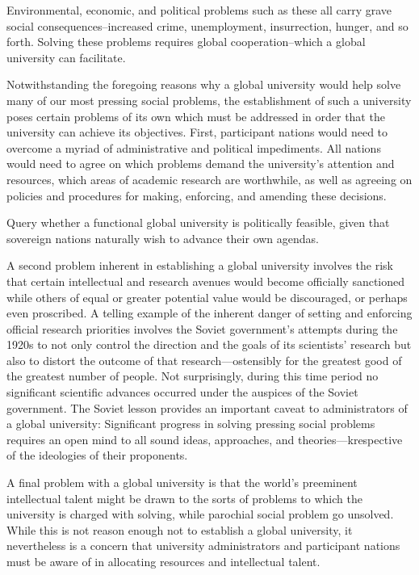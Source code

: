 Environmental, economic, and political problems such as these all carry grave social consequences--increased crime, unemployment, insurrection, hunger, and so forth.
Solving these problems requires global cooperation--which a global university can facilitate.


Notwithstanding the foregoing reasons why a global university would help solve many of our most pressing social problems, the establishment of such a university poses certain problems of its own which must be addressed in order that the university can achieve its objectives.
First, participant nations would need to overcome a myriad of administrative and political impediments.
All nations would need to agree on which problems demand the university's attention and resources, which areas of academic research are worthwhile, as well as agreeing on policies and procedures for making, enforcing, and amending these decisions.


Query whether a functional global university is politically feasible, given that sovereign nations naturally wish to advance their own agendas.


A second problem inherent in establishing a global university involves the risk that certain intellectual and research avenues would become officially sanctioned while others of equal or greater potential value would be discouraged, or perhaps even proscribed.
A telling example of the inherent danger of setting and enforcing official research priorities involves the Soviet government's attempts during the 1920s to not only control the direction and the goals of its scientists' research but also to distort the outcome of that research---ostensibly for the greatest good of the greatest number of people.
Not surprisingly, during this time period no significant scientific advances occurred under the auspices of the Soviet government.
The Soviet lesson provides an important caveat to administrators of a global university: Significant progress in solving pressing social problems requires an open mind to all sound ideas, approaches, and theories---krespective of the ideologies of their proponents.


A final problem with a global university is that the world's preeminent intellectual talent might be drawn to the sorts of problems to which the university is charged with solving, while parochial social problem go unsolved.
While this is not reason enough not to establish a global university, it nevertheless is a concern that university administrators and participant nations must be aware of in allocating resources and intellectual talent.


